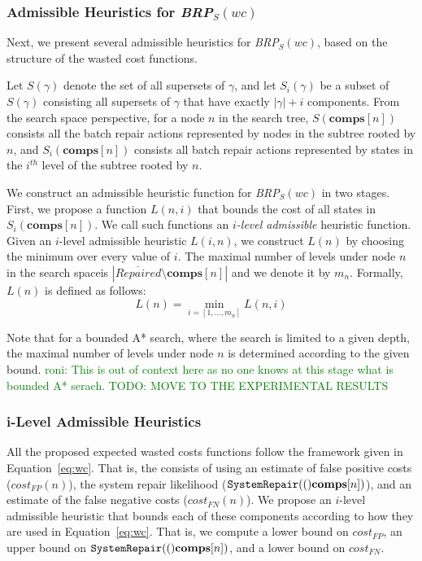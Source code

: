 \documentclass[review]{elsarticle}
\newcommand\roni[1]{\textcolor{green}{roni: #1}}
\newcommand{\notrepaired}{{\overline{\textit{Repaired}}}}
\newcommand\sysrep[1]{{\tt SystemRepair(#1)}}
\newcommand{\brpswc}{\textit{BRP$_S(wc)$}}
\newcommand{\comps}{\textbf{comps}}
\begin{document}
\subsubsection*{Admissible Heuristics for \brpswc{}}
Next, we present several admissible heuristics for \brpswc{}, based on the structure of the wasted cost functions. 

Let $S(\gamma)$ denote the set of all supersets of $\gamma$, and let $S_i(\gamma)$ be a subset of $S(\gamma)$ consisting all supersets of $\gamma$ that have exactly $|\gamma|+i$  components. From the search space perspective, 
for a node $n$ in the search tree, $S(\comps[n])$ consists all the batch repair actions represented by nodes in the subtree rooted by $n$, and $S_i(\comps[n])$ consists all batch repair actions represented by states in the $i^{th}$ level of the subtree rooted by $n$. 


We construct an admissible heuristic function for \brpswc{} in two stages. First, we  propose a function $L(n,i)$ that bounds the cost of all states in $S_i(\comps[n])$. We call such functions an {\em $i$-level admissible} heuristic function. Given an $i$-level admissible heuristic $L(i,n)$, we construct $L(n)$ by choosing the minimum over every value of $i$. The maximal number of levels under node $n$ in the search spaceis $|\notrepaired{}\setminus\comps[n]|$ and we denote it by $m_n$.  
Formally, $L(n)$ is defined as follows:
\begin{equation}
L(n)=\min_{i=[1,\ldots, m_n]} L(n,i)
\label{eq:b-admissible}
\end{equation}

Note that for a bounded A* search, where the search is limited to a given depth, the maximal number of levels under node $n$ is determined according to the given bound.
\roni{This is out of context here as no one knows at this stage what is bounded A* serach. TODO: MOVE TO THE EXPERIMENTAL RESULTS}

\subsubsection*{i-Level Admissible Heuristics}

All the proposed expected wasted costs functions follow the framework given in Equation~\ref{eq:wc}. That is, the consists of using 
an estimate of false positive costs ($cost_{FP}(n)$), 
the system repair likelihood ($\sysrep(\comps[n])$), 
and an estimate of the false negative costs ($cost_{FN}(n)$). 
We propose an $i$-level admissible heuristic that bounds each of these components according to how they are used in Equation~\ref{eq:wc}. That is, we compute a lower bound on $cost_{FP}$, an upper bound on $\sysrep(\comps[n])$, 
and a lower bound on $cost_{FN}$. 
\end{document}
